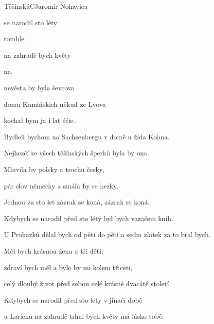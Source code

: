 \setcounter{page}{86}
\begin{song}{Těšínská}{C}{Jaromír Nohavica}

\begin{SBVerse}

 se narodil  sto léty 

 tomhle   {}

 na zahradě  bych květy

 ne.

 nevěsta by byla  ševcova

 domu Kamińskich někud ze Lvova

kochał bym ja i   lat śćie.

\end{SBVerse}

\begin{SBVerse}

Bydleli bychom na Sachsenbergu v domě u žida Kohna.

Nejhezčí ze všech těšínských šperků byla by ona.

Mluvila by polsky a trochu česky,

pár slov německy a smála by se hezky.

Jednou za sto let zázrak se koná, zázrak se koná.

\end{SBVerse}

\begin{SBVerse}

Kdybych se narodil před sto léty byl bych vazačem knih.

U Prohazků dělal bych od pěti do pěti a sedm zlatek za to bral bych.

Měl bych krásnou ženu a tři děti,

zdraví bych měl a bylo by mi kolem třiceti,

celý dlouhý život před sebou celé krásné dvacáté století.

\end{SBVerse}

\begin{SBVerse}

Kdybych se narodil před sto léty v jinačí době

u Larichů na zahradě trhal bych květy má lásko tobě.


\end{SBVerse}
\end{song}
